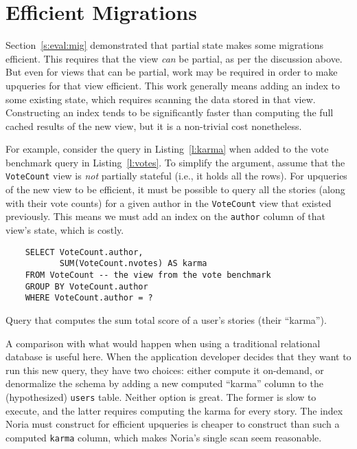 \section{Efficient Migrations}

Section~\ref{s:eval:mig} demonstrated that partial state makes some migrations
efficient. This requires that the view \emph{can} be partial, as per the
discussion above. But even for views that can be partial, work may be required
in order to make upqueries for that view efficient. This work generally means
adding an index to some existing state, which requires scanning the data stored
in that view. Constructing an index tends to be significantly faster than
computing the full cached results of the new view, but it is a non-trivial cost
nonetheless.

For example, consider the query in Listing~\vref{l:karma} when added to the vote
benchmark query in Listing~\vref{l:votes}. To simplify the argument, assume that
the \texttt{VoteCount} view is \emph{not} partially stateful (i.e., it holds all
the rows). For upqueries of the new view to be efficient, it must be possible to
query all the stories (along with their vote counts) for a given author in the
\texttt{VoteCount} view that existed previously. This means we must add an index
on the \texttt{author} column of that view's state, which is costly.

\begin{listing}[h]
  \begin{verbatim}
    SELECT VoteCount.author,
           SUM(VoteCount.nvotes) AS karma
    FROM VoteCount -- the view from the vote benchmark
    GROUP BY VoteCount.author
    WHERE VoteCount.author = ?
  \end{verbatim}
  \caption{Query that computes the sum total score of a user's stories
  (their ``karma'').}
  \label{l:karma}
\end{listing}

A comparison with what would happen when using a traditional relational database
is useful here. When the application developer decides that they want to run
this new query, they have two choices: either compute it on-demand, or
denormalize the schema by adding a new computed ``karma'' column to the
(hypothesized) \texttt{users} table. Neither option is great. The former is slow
to execute, and the latter requires computing the karma for every story. The
index Noria must construct for efficient upqueries is cheaper to construct than
such a computed \texttt{karma} column, which makes Noria's single scan seem
reasonable.

